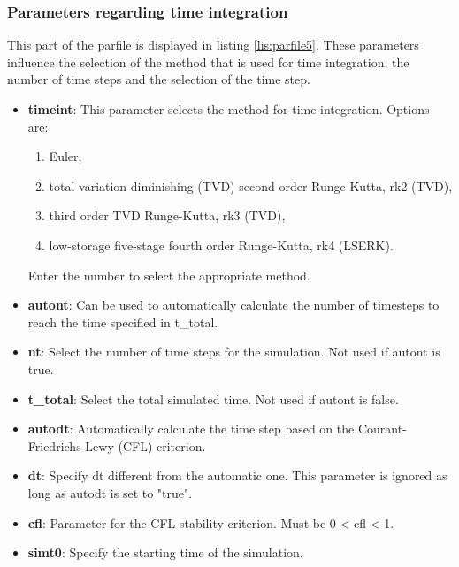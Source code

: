 		\subsubsection{Parameters regarding time integration}
			This part of the parfile is displayed in listing \ref{lis:parfile5}. These parameters influence the selection of the method that is used for time integration, the number of time steps and the selection of the time step. 
			 
    	\begin{itemize}
    		\item \textbf{timeint}: This parameter selects the method for time integration. Options are:
  			\begin{enumerate}
  				\item Euler,
  				\item total variation diminishing (TVD) second order Runge-Kutta, rk2 (TVD),
  				\item third order TVD Runge-Kutta, rk3 (TVD),
  				\item low-storage five-stage fourth order Runge-Kutta, rk4 (LSERK).
  			\end{enumerate}
  			Enter the number to select the appropriate method.
  			\item \textbf{autont}: Can be used to automatically calculate the number of timesteps to reach the time specified in t\_total.
  			\item \textbf{nt}: Select the number of time steps for the simulation. Not used if autont is true.
  			\item \textbf{t\_total}: Select the total simulated time. Not used if autont is false.
  			\item \textbf{autodt}: Automatically calculate the time step based on the Courant-Friedrichs-Lewy (CFL) criterion.
  			\item \textbf{dt}: Specify dt different from the automatic one. This parameter is ignored as long as autodt is set to "true". 
  			\item \textbf{cfl}: Parameter for the CFL stability criterion. Must be 0 < cfl < 1. %
  			\item \textbf{simt0}: Specify the starting time of the simulation.
    	\end{itemize}
